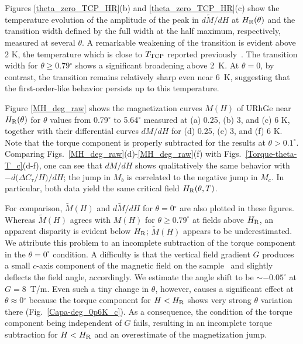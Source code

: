 \documentclass[twocolumn, aps, superscriptaddress, amsfonts,floatfix]{revtex4}%
\begin{document}
{Figures \ref{theta_zero_TCP_HR}(b) and \ref{theta_zero_TCP_HR}(c) show the temperature evolution of the amplitude of the peak in $d\tilde{M}/dH$  at $H_{\rm R}(\theta)$ and the transition width defined by the full width at the half maximum, respectively, measured at several $\theta$.
A remarkable weakening of the transition is evident above  2 K, the  temperature which is close to $T_{\rm TCP}$ reported previously~\cite{gourgout2016collapse}.
The transition width for $\theta\geq 0.79$$^\circ$ shows a significant broadening above 2~K.
At $\theta=0$, by contrast, the transition remains relatively sharp even near 6~K, suggesting that the first-order-like behavior persists up to this temperature.


Figure \ref{MH_deg_raw} shows the magnetization curves $M(H)$ of URhGe near $H_{\rm R}(\theta)$ for $\theta$ values from 0.79$^\circ$ to 5.64$^\circ$  measured at (a) 0.25, (b) 3, and  (c) 6 K, together with their differential curves $dM/dH$ for (d) 0.25, (e) 3, and  (f) 6 K.
Note that the torque component is properly subtracted for the results at $\theta > 0.1^\circ$.
Comparing Figs.~\ref{MH_deg_raw}(d)-\ref{MH_deg_raw}(f) with Figs.~\ref{Torque-theta-T_c}(d-f), one can see that $dM/dH$ shows qualitatively the same behavior with $-d(\Delta$$C_{\tau}/H)$$/dH$; the jump in $M_b$  is correlated to the negative jump in $M_c$. 
In particular, both data yield the same critical field $H_{\rm R}(\theta,T)$.


For comparison, $\tilde{M}(H)$ and $d\tilde{M}/dH$ for $\theta = 0$$^\circ$ are also plotted in these figures.
Whereas $\tilde{M}(H)$ agrees with $M(H)$ for $\theta\ge 0.79^\circ$ at fields above $H_{\rm R}$, 
an apparent disparity is evident below $H_{\rm R}$;
 $\tilde{M}(H)$ appears to be underestimated.
We attribute this problem to an incomplete subtraction of the torque component in the $\theta=0^\circ$ condition. 
A difficulty is that the vertical field gradient $G$ produces a small $c$-axis component of the magnetic field on the sample~\cite{note} and slightly deflects the field angle, accordingly. We estimate the angle shift to be $\sim -0.05^\circ$ at $G=8$~T/m. Even such a tiny change in $\theta$, however, causes a significant effect at $\theta\approx0$$^\circ$ because the torque component for $H<H_{\rm R}$ shows very strong $\theta$ variation there (Fig.~\ref{Capa-deg_0p6K_c}).
As a consequence, the condition of the torque component being independent of $G$ fails, resulting in an incomplete torque subtraction for $H<H_{\rm R}$ and an overestimate of the magnetization jump. 

}
\end{document}
